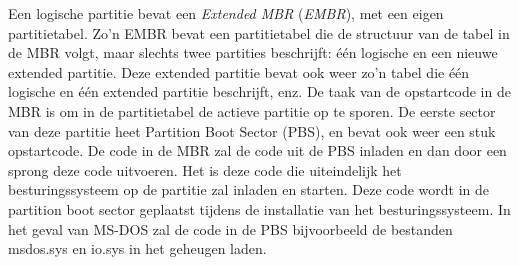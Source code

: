 Een logische partitie bevat een \emph{Extended
MBR} (\emph{EMBR}), met een eigen
partitietabel. Zo'n EMBR bevat een partitietabel die de structuur van
de tabel in de MBR volgt, maar slechts twee partities beschrijft: \'e\'en
logische en een nieuwe extended partitie. Deze extended partitie bevat
ook weer zo'n tabel die \'e\'en logische en \'e\'en extended partitie
beschrijft, enz. De taak van de opstartcode in de MBR is om in de
partitietabel de actieve partitie op te sporen. De eerste sector van
deze partitie heet Partition Boot Sector (PBS), en bevat ook weer een
stuk opstartcode. De code in de MBR zal de code uit de PBS inladen en
dan door een sprong deze code uitvoeren. Het is deze code die
uiteindelijk het besturingssysteem op de partitie zal inladen en
starten. Deze code wordt in de partition boot sector geplaatst tijdens
de installatie van het besturingssysteem. In het geval van MS-DOS zal
de code in de PBS bijvoorbeeld de bestanden msdos.sys en io.sys in het
geheugen laden.
